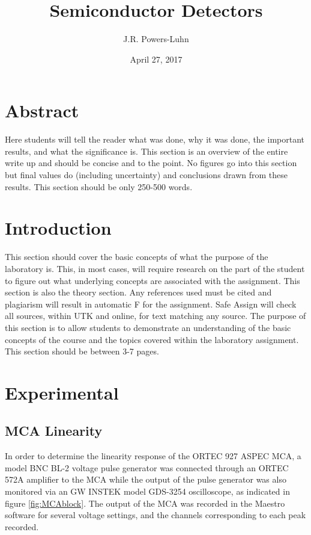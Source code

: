 \documentclass[12pt]{article}
\title{Semiconductor Detectors}
\author{J.R. Powers-Luhn}
\date{April 27, 2017}
\begin{document}

\maketitle

\section{Abstract}
Here students will tell the reader what was done, why it was done, the important results, and what the significance is. This section is an overview of the entire write up and should be concise and to the point. No figures go into this section but final values do (including uncertainty) and conclusions drawn from these results. This section should be only 250-500 words.

\section{Introduction}
This section should cover the basic concepts of what the purpose of the laboratory is. This, in most cases, will require research on the part of the student to figure out what underlying concepts are associated with the assignment. This section is also the theory section. Any references used must be cited and plagiarism will result in automatic F for the assignment. Safe Assign will check all sources, within UTK and online, for text matching any source. The purpose of this section is to allow students to demonstrate an understanding of the basic concepts of the course and the topics covered within the laboratory assignment. This section should be between 3-7 pages.

\section{Experimental}
\subsection{MCA Linearity}
In order to determine the linearity response of the ORTEC 927 ASPEC MCA, a model BNC BL-2 voltage pulse generator was connected through an ORTEC 572A amplifier to the MCA while the output of the pulse generator was also monitored via an GW INSTEK model GDS-3254 oscilloscope, as indicated in figure \ref{fig:MCAblock}. The output of the MCA was recorded in the Maestro software for several voltage settings, and the channels corresponding to each peak recorded.
\end{document}
